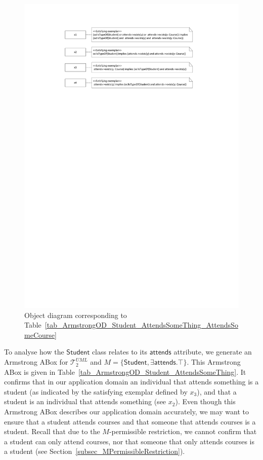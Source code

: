 \documentclass{amsart}
\begin{document}
      \begin{figure}
 	\centering \includegraphics[trim = 30mm 215mm 30mm 15mm, clip, scale=0.9]{./ArmstrongOD_Student_AttendsSomeThing_AttendsSomeCourse.pdf}
 	\caption{Object diagram corresponding to Table~\ref{tab_ArmstrongOD_Student_AttendsSomeThing_AttendsSomeCourse}}
 		\label{fig_ArmstrongOD_Student_AttendsSomeThing_AttendsSomeCourse}
 \end{figure}  
 
 
  To analyse how the $\mathsf{Student}$ class relates to its $\mathsf{attends}$ attribute, we generate an Armstrong ABox for $\mathcal{T}_2^{UML}$ and $M = \{\mathsf{Student}, \exists \mathsf{attends}.\top\}$. This Armstrong ABox is given in Table~\ref{tab_ArmstrongOD_Student_AttendsSomeThing}. It confirms that in our application domain an individual that attends something is a student (as indicated by the satisfying exemplar defined by $x_3$), and that a student is an individual that attends something (see $x_2$). Even though this Armstrong ABox describes our application domain accurately, we may want to ensure that a student attends courses and that someone that attends courses is a student.
  Recall that due to the $M$-permissible restriction, we cannot confirm that a student can only attend courses, nor that someone that only attends courses is a student (see Section~\ref{subsec_MPermissibleRestriction}). 
  
\end{document}
